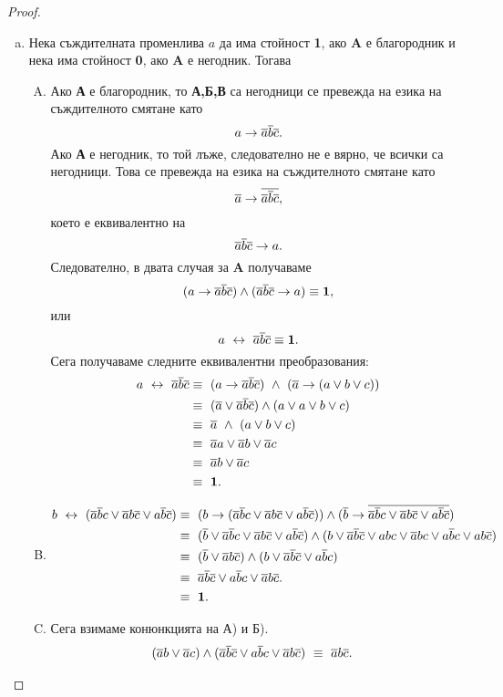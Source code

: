 \begin{proof}
  \begin{enumerate}[a)]
  \item
    Нека съждителната променлива $a$ да има стойност {\bf 1}, ако {\bf A} е благородник и нека има стойност {\bf 0}, 
    ако {\bf A} е негодник.
    Тогава
    \begin{enumerate}[A)]
    \item
      Ако {\bf А} е благородник, то {\bf А,Б,В} са негодници се превежда на езика на съждителното смятане като
      \[a \rightarrow \overline{a}\overline{b}\overline{c}.\]
      Ако {\bf А} е негодник, то той лъже, следователно не е вярно, че всички са негодници. Това се превежда на езика на съждителното смятане като
      \[\overline{a} \rightarrow \overline{\overline{a}\overline{b}\overline{c}},\] 
      което е еквивалентно на \[\overline{a}\overline{b}\overline{c}\rightarrow a.\]
      Следователно, в двата случая за {\bf A} получаваме
      \[(a \rightarrow \overline{a}\overline{b}\overline{c}) \wedge (\overline{a}\overline{b}\overline{c}\rightarrow a) \equiv \mathbf{1},\]
      или
      \[a \ \leftrightarrow\  \overline{a}\overline{b}\overline{c} \equiv \mathbf{1}.\]
      Сега получаваме следните еквивалентни преобразования:
      \begin{align*}
        a \ \leftrightarrow\  \overline{a}\overline{b}\overline{c} & \equiv\ (a \rightarrow \overline{a}\overline{b}\overline{c})\ \wedge\ (\overline{a}\rightarrow (a\vee b \vee c))\\
        & \equiv\ (\overline{a} \vee \overline{a}\overline{b}\overline{c}) \wedge (a \vee a\vee b \vee c)\\
        & \equiv\ \overline{a}\ \wedge\ (a \vee b \vee c)\\
        & \equiv\ \overline{a}a \vee \overline{a}b \vee \overline{a}c\\
        & \equiv\ \overline{a}b \vee \overline{a}c\\
        & \equiv\ \mathbf{1}.
      \end{align*}
    \item
      \begin{align*}
        b \ \leftrightarrow\  (\overline{a}\overline{b}c\vee \overline{a}b\overline{c}\vee a\overline{b}\overline{c}) & \equiv\ (b \rightarrow (\overline{a}\overline{b}c\vee \overline{a}b\overline{c}\vee a\overline{b}\overline{c}))\wedge (\overline{b}\rightarrow \overline{\overline{a}\overline{b}c\vee \overline{a}b\overline{c}\vee a\overline{b}\overline{c}})\\
        & \equiv\ (\overline{b} \vee \overline{a}\overline{b}c\vee \overline{a}b\overline{c}\vee a\overline{b}\overline{c}) \wedge (b\vee \overline{a}\overline{b}\overline{c}\vee abc \vee \overline{a}bc \vee a\overline{b}c \vee ab\overline{c})\\
        & \equiv\ (\overline{b} \vee \overline{a}b\overline{c}) \wedge (b \vee \overline{a}\overline{b}\overline{c} \vee  a\overline{b}c)\\
        & \equiv\ \overline{a}\overline{b}\overline{c} \vee  a\overline{b}c \vee \overline{a}b\overline{c}.\\
        & \equiv\ \mathbf{1}. 
      \end{align*}
    \item
      Сега взимаме конюнкцията на А) и Б).
      \begin{align*}
        (\overline{a}b \vee \overline{a}c)\wedge (\overline{a}\overline{b}\overline{c} \vee  a\overline{b}c \vee \overline{a}b\overline{c}) &\ \equiv\ \overline{a}b\overline{c}.
      \end{align*}
    \end{enumerate}
  \end{enumerate}
\end{proof}

